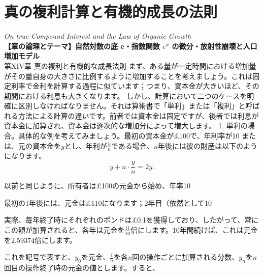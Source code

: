 \documentclass[a4paper,11pt,openany]{ltjsbook}
\begin{document}
\chapter{真の複利計算と有機的成長の法則}
\noindent\textit{\large On true Compound Interest and the Law of Organic Growth}\\[2mm]
\noindent\textbf{\small 【章の論理とテーマ】自然対数の底 e・指数関数 $e^x$ の微分・放射性崩壊と人口増加モデル}\\[4mm]
第XIV章 真の複利と有機的な成長法則
まず、ある量が一定時間における増加量がその量自身の大きさに比例するように増加することを考えましょう。これは固定利率で金利を計算する過程に似ています；つまり、資本金が大きいほど、その期間における利息も大きくなります。
しかし、計算において二つのケースを明確に区別しなければなりません。それは算術書で「単利」または「複利」と呼ばれる方法による計算の違いです。前者では資本金は固定ですが、後者では利息が資本金に加算され、資本金は逐次的な増加分によって増大します。
1. 単利の場合。具体的な例を考えてみましょう。最初の資本金が£100で、年利率が10%
または、元の資本金を$y$とし、年利が$\frac{y}{n}$である場合、$n$年後には彼の財産は以下のようになります。
\[
y + n \cdot \frac{y}{n} = 2y.
\]

以前と同じように、所有者は£100の元金から始め、年率10%

最初の1年後には、元金は£110になります；2年目（依然として10%

実際、毎年終了時にそれぞれのポンドは£0.1を獲得しており、したがって、常にこの額が加算されると、各年は元金を$\frac{11}{10}$倍にします。10年間続けば、これは元金を2.59374倍にします。

これを記号で表すと、$y_0$を元金、$\frac{1}{n}$を各$n$回の操作ごとに加算される分数、$y_n$を$n$回目の操作終了時の元金の値とします。すると、
\end{document}
